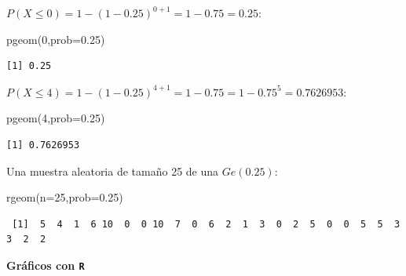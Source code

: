 \documentclass[
  letterpaper,
  DIV=11,
  numbers=noendperiod]{scrreprt}
\newenvironment{Shaded}{\begin{snugshade}}{\end{snugshade}}
\newcommand{\AttributeTok}[1]{\textcolor[rgb]{0.40,0.45,0.13}{#1}}
\newcommand{\DecValTok}[1]{\textcolor[rgb]{0.68,0.00,0.00}{#1}}
\newcommand{\FloatTok}[1]{\textcolor[rgb]{0.68,0.00,0.00}{#1}}
\newcommand{\FunctionTok}[1]{\textcolor[rgb]{0.28,0.35,0.67}{#1}}
\newcommand{\NormalTok}[1]{\textcolor[rgb]{0.00,0.23,0.31}{#1}}
\begin{document}
\(P(X\leq 0)=1- (1-0.25)^{0+1}=1-0.75=0.25\):

\begin{Shaded}
\begin{Highlighting}[]
\FunctionTok{pgeom}\NormalTok{(}\DecValTok{0}\NormalTok{,}\AttributeTok{prob=}\FloatTok{0.25}\NormalTok{)}
\end{Highlighting}
\end{Shaded}

\begin{verbatim}
[1] 0.25
\end{verbatim}

\(P(X\leq 4)=1-(1-0.25)^{4+1}=1-0.75=1-0.75^5=0.7626953\):

\begin{Shaded}
\begin{Highlighting}[]
\FunctionTok{pgeom}\NormalTok{(}\DecValTok{4}\NormalTok{,}\AttributeTok{prob=}\FloatTok{0.25}\NormalTok{)}
\end{Highlighting}
\end{Shaded}

\begin{verbatim}
[1] 0.7626953
\end{verbatim}

Una muestra aleatoria de tamaño 25 de una \(Ge(0.25)\):

\begin{Shaded}
\begin{Highlighting}[]
\FunctionTok{rgeom}\NormalTok{(}\AttributeTok{n=}\DecValTok{25}\NormalTok{,}\AttributeTok{prob=}\FloatTok{0.25}\NormalTok{)}
\end{Highlighting}
\end{Shaded}

\begin{verbatim}
 [1]  5  4  1  6 10  0  0 10  7  0  6  2  1  3  0  2  5  0  0  5  5  3  3  2  2
\end{verbatim}

\textbf{Gráficos con \texttt{R}}
\end{document}

